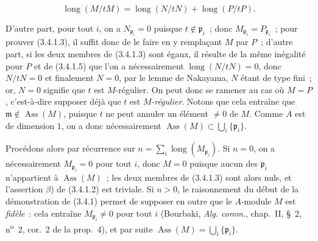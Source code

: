 \begin{env}[3.4.1.5]
\label{IV.2.3.4.1.5-fr}
\[
\operatorname{long}(M/tM)
=\operatorname{long}(N/tN)+\operatorname{long}(P/tP).
\]
\end{env}

D'autre part, pour tout $i$, on a $N_{\mathfrak p_i}=0$ puisque
$t\notin\mathfrak p_i$~; donc $M_{\mathfrak p_i}=P_{\mathfrak p_i}$~; pour
prouver (3.4.1.3), il suffit donc de le faire en y remplaçant $M$ par $P$~;
d'autre part, si les deux membres de (3.4.1.3) sont égaux, il résulte de la
même inégalité pour $P$ et de (3.4.1.5) que l'on a nécessairement
$\operatorname{long}(N/tN)=0$, donc $N/tN=0$ et finalement $N=0$, par le lemme
de Nakayama, $N$ étant de type fini~; or, $N=0$ signifie que $t$ est
$M$-régulier. On peut donc se ramener au cas où $M=P$, c'est-à-dire supposer
déjà que $t$ est $M$-\emph{régulier}. Notons que cela entraîne que
$\mathfrak m\notin\operatorname{Ass}(M)$, puisque $t$ ne peut annuler un
élément $\neq0$ de $M$. Comme $A$ est de dimension $1$, on a donc
nécessairement
$\operatorname{Ass}(M)\subset\bigcup_i\{\mathfrak p_i\}$.

Procédons alors par récurrence sur
$n=\sum_i\operatorname{long}(M_{\mathfrak p_i})$. Si $n=0$, on a
nécessairement $M_{\mathfrak p_i}=0$ pour tout $i$, donc $M=0$ puisque aucun
des $\mathfrak p_i$ n'appartient à $\operatorname{Ass}(M)$~; les deux membres
de (3.4.1.3) sont alors nuls, et l'assertion $\beta$) de (3.4.1.2) est
triviale. Si $n>0$, le raisonnement du début de la démonstration de (3.4.1)
permet de supposer en outre que le $A$-module $M$ est \emph{fidèle}~: cela entraîne
$M_{\mathfrak p_i}\neq0$ pour tout $i$ (Bourbaki, \emph{Alg. comm.}, chap.~II,
\S~2, n\textsuperscript{o}~2, cor.~2 de la prop.~4), et par suite
$\operatorname{Ass}(M)=\bigcup_i\{\mathfrak p_i\}$.

